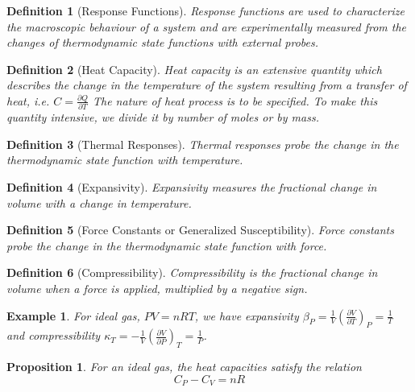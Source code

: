\documentclass[a4paper]{article}
\newtheorem{eg}{Example}[section]
\theoremstyle{new}
\newtheorem{defi}{Definition}[section]
\newtheorem{prop}{Proposition}[section]
\begin{document}
\begin{defi}[Response Functions]
Response functions are used to characterize the macroscopic behaviour of a system and are experimentally measured from the changes of thermodynamic state functions with external probes.
\end{defi}
\begin{defi}[Heat Capacity]
Heat capacity is an extensive quantity which describes the change in the temperature of the system resulting from a transfer of heat, i.e. $C=\frac{\partial Q}{\partial T}$ The nature of heat process is to be specified. To make this quantity intensive, we divide it by number of moles or by mass.
\end{defi}
\begin{defi}[Thermal Responses]
Thermal responses probe the change in the thermodynamic state function with temperature.
\end{defi}
\begin{defi}[Expansivity]
Expansivity measures the fractional change in volume with a change in temperature.
\end{defi}
\begin{defi}[Force Constants or Generalized Susceptibility]
Force constants probe the change in the thermodynamic state function with force.
\end{defi}
\begin{defi}[Compressibility]
Compressibility is the fractional change in volume when a force is applied, multiplied by a negative sign.
\end{defi}
\begin{eg}
For ideal gas, $PV=nRT$, we have expansivity $\beta_P=\frac{1}{V}(\frac{\partial V}{\partial T})_P=\frac{1}{T}$ and compressibility $\kappa_T=-\frac{1}{V}(\frac{\partial V}{\partial P})_T=\frac{1}{P}$.
\end{eg}
\begin{prop}
For an ideal gas, the heat capacities satisfy the relation
\begin{equation}
C_P-C_V=nR\label{heatcapacities}
\end{equation}
\end{prop}
\end{document}
